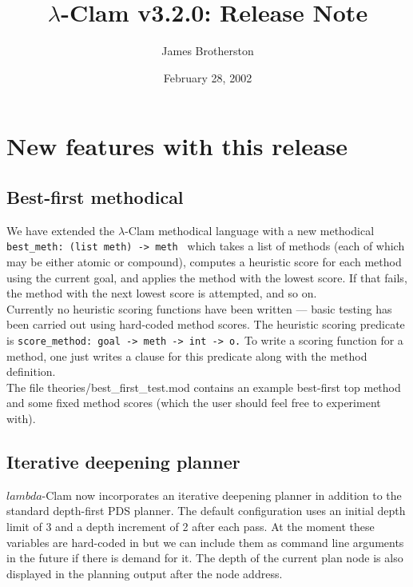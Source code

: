 \documentclass[11pt]{article}
\begin{document}
\title{$\lambda$-Clam v3.2.0: Release Note} 

\author{James Brotherston}

\date{February 28, 2002}

\maketitle

\section{New features with this release}

\subsection{Best-first methodical}
We have extended the $\lambda$-Clam methodical language with a new
methodical \verb+ best_meth: (list meth) -> meth + which takes a list
of methods (each of which may be either atomic or compound), computes
a heuristic score for each method using the current goal, and applies
the method with the lowest score.  If that fails, the method with the
next lowest score is attempted, and so on. \\

\noindent Currently no heuristic scoring functions have been written --- basic
testing has been carried out using hard-coded method scores.  The
heuristic scoring predicate is \texttt{score\_method: goal -> meth ->
  int -> o.}  To write a scoring function for a method, one just
writes a clause for this predicate along with the method definition. \\

\noindent The file theories/best\_first\_test.mod contains an example
best-first top method and some fixed method scores (which the user
should feel free to experiment with).

\subsection{Iterative deepening planner}
$lambda$-Clam now incorporates an iterative deepening planner in
addition to the standard depth-first PDS planner.  The default
configuration uses an initial depth limit of 3 and a depth increment
of 2 after each pass.  At the moment these variables are hard-coded in 
but we can include them as command line arguments in the future if
there is demand for it.  The depth of the current plan node is also
displayed in the planning output after the node address. \\
\end{document}
